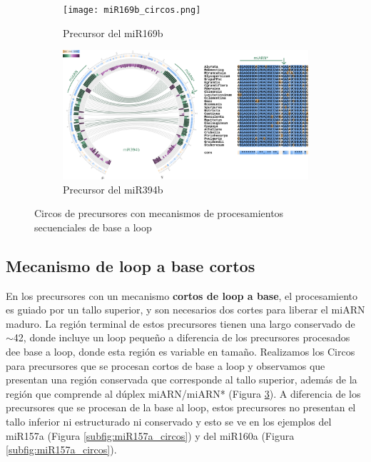 \begin{landscape}
	\begin{figure}
	\centering
	\begin{subfigure}{.75\textwidth}
	  \centering
	  \texttt{[image: miR169b\_circos.png]}
	  \caption{Precursor del miR169b}
	  \label{subfig:miR169b_circos}
	\end{subfigure}%
	\begin{subfigure}{.75\textwidth}
	  \centering
	  \includegraphics[width=.9\linewidth]{miR394b_circos.png}
	  \caption{Precursor del miR394b}
	  \label{subfig:miR394b_circos}
	\end{subfigure}
	\caption{Circos de precursores con mecanismos de procesamientos secuenciales de base a loop}
	\label{fig:seqBTL_circos}
	\end{figure}
\end{landscape}


\subsection{Mecanismo de loop a base cortos}

En los precursores con un mecanismo \textbf{cortos de loop a base}, el procesamiento es guiado por un tallo superior, y son necesarios dos cortes para liberar el miARN maduro.
La región terminal de estos precursores tienen una largo conservado de $\sim$42, donde incluye un loop pequeño \citep{Bologna2013} a diferencia de los precursores procesados dee base a loop, donde esta región es variable en tamaño.
Realizamos los Circos para precursores que se procesan cortos de base a loop y observamos que presentan una región conservada que corresponde al tallo superior, además de la región que comprende al dúplex miARN/miARN* (Figura \ref{fig:seqBTL_circos}).
A diferencia de los precursores que se procesan de la base al loop, estos precursores no presentan el tallo inferior ni estructurado ni conservado y esto se ve en los ejemplos del miR157a (Figura \ref{subfig:miR157a_circos}) y del miR160a (Figura \ref{subfig:miR157a_circos}).



